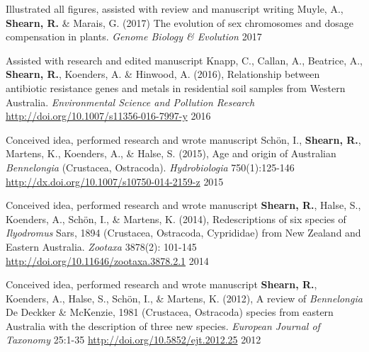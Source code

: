\begin{cvpubs}
  \cvpub
	{Illustrated all figures, assisted with review and manuscript writing} %
	{Muyle, A., \textbf{Shearn, R.} \& Marais, G. (2017) The evolution of sex chromosomes and dosage compensation in plants. \emph{Genome Biology \& Evolution}} %
	{2017} %
	
  \cvpub
	{Assisted with research and edited manuscript} %
	{Knapp, C., Callan, A., Beatrice, A., \textbf{Shearn, R.}, Koenders, A. \& Hinwood, A. (2016), Relationship between antibiotic resistance genes and metals in residential soil samples from Western Australia. \emph{Environmental Science and Pollution Research} \href{http://doi.org/10.1007/s11356-016-7997-y}{http://doi.org/10.1007/s11356-016-7997-y}} %
	{2016} %
	
  \cvpub
	{Conceived idea, performed research and wrote manuscript} %
	{Schön, I., \textbf{Shearn, R.}, Martens, K., Koenders, A., \& Halse, S. (2015), Age and origin of Australian \textit{Bennelongia} (Crustacea, Ostracoda). \emph{Hydrobiologia} 750(1):125-146 \href{http://dx.doi.org/10.1007/s10750-014-2159-z}{http://dx.doi.org/10.1007/s10750-014-2159-z}} %
	{2015} %
	
  \cvpub
	{Conceived idea, performed research and wrote manuscript} %
	{\textbf{Shearn, R.}, Halse, S., Koenders, A., Schön, I., \& Martens, K. (2014), Redescriptions of six species of \textit{Ilyodromus} Sars, 1894 (Crustacea, Ostracoda, Cyprididae) from New Zealand and Eastern Australia. \emph{Zootaxa} 3878(2): 101-145 \href{http://doi.org/10.11646/zootaxa.3878.2.1}{http://doi.org/10.11646/zootaxa.3878.2.1}} %
	{2014} %
	
  \cvpub
	{Conceived idea, performed research and wrote manuscript} %
	{\textbf{Shearn, R.}, Koenders, A., Halse, S., Schön, I., \& Martens, K. (2012), A review of \textit{Bennelongia} De Deckker \& McKenzie, 1981 (Crustacea, Ostracoda) species from eastern Australia with the description of three new species. \emph{European Journal of Taxonomy} 25:1-35 \href{http://doi.org/10.5852/ejt.2012.25}{http://doi.org/10.5852/ejt.2012.25}} %
	{2012} %
	
\end{cvpubs}

